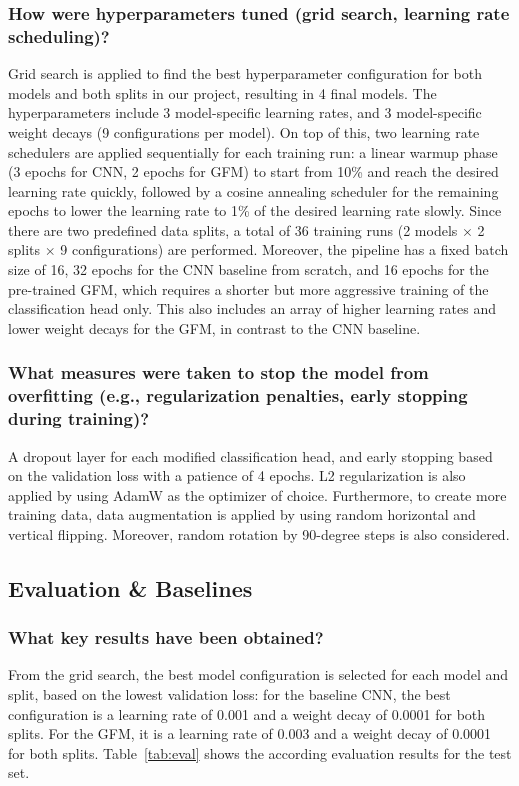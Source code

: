 \documentclass[sigconf]{acmart}
\begin{document}
\subsubsection{How were hyperparameters tuned (grid search, learning rate scheduling)?} Grid search is applied to find the best hyperparameter configuration for both models and both splits in our project, resulting in 4 final models. The hyperparameters include 3 model-specific learning rates, and 3 model-specific weight decays (9 configurations per model). On top of this, two learning rate schedulers are applied sequentially for each training run: a linear warmup phase (3 epochs for CNN, 2 epochs for GFM) to start from 10\% and reach the desired learning rate quickly, followed by a cosine annealing scheduler for the remaining epochs to lower the learning rate to 1\% of the desired learning rate slowly. Since there are two predefined data splits, a total of 36 training runs (2 models $\times$ 2 splits $\times$ 9 configurations) are performed. Moreover, the pipeline has a fixed batch size of 16, 32 epochs for the CNN baseline from scratch, and 16 epochs for the pre-trained GFM, which requires a shorter but more aggressive training of the classification head only. This also includes an array of higher learning rates and lower weight decays for the GFM, in contrast to the CNN baseline.
\subsubsection{What measures were taken to stop the model from overfitting (e.g., regularization penalties, early stopping during training)?} A dropout layer for each modified classification head, and early stopping based on the validation loss with a patience of 4 epochs. L2 regularization is also applied by using AdamW as the optimizer of choice. Furthermore, to create more training data, data augmentation is applied by using random horizontal and vertical flipping. Moreover, random rotation by 90-degree steps is also considered.

\subsection{Evaluation \& Baselines}
\subsubsection{What key results have been obtained?}
From the grid search, the best model configuration is selected for each model and split, based on the lowest validation loss: for the baseline CNN, the best configuration is a learning rate of 0.001 and a weight decay of 0.0001 for both splits. For the GFM, it is a learning rate of 0.003 and a weight decay of 0.0001 for both splits. Table~\ref{tab:eval} shows the according evaluation results for the test set.
\end{document}
